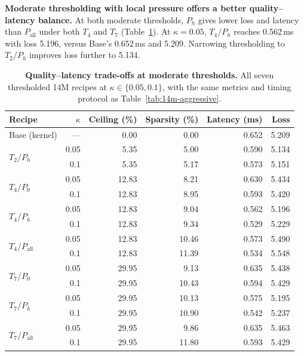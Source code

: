 \textbf{Moderate thresholding with local pressure offers a better quality--latency balance.}
At both moderate thresholds, $P_h$ gives lower loss and latency than $P_{\mathrm{all}}$ under both $T_4$ and $T_7$ (Table~\ref{tab:14m-moderate}). At $\kappa=0.05$, $T_4/P_h$ reaches 0.562\,ms with loss 5.196, versus Base's 0.652\,ms and 5.209. Narrowing thresholding to $T_2/P_h$ improves loss further to 5.134.

\begin{table}[!htbp]
\centering\small
\setlength{\tabcolsep}{7pt}
\caption{\textbf{Quality--latency trade-offs at moderate thresholds.} All seven thresholded 14M recipes at $\kappa\in\{0.05,0.1\}$, with the same metrics and timing protocol as Table~\ref{tab:14m-aggressive}.}
\label{tab:14m-moderate}
\begin{tabular}{@{}lrrrrr@{}}
\toprule
Recipe & $\kappa$ & Ceiling (\%) & Sparsity (\%) & Latency (ms) & Loss \\
\midrule
Base (kernel) & --- & 0.00 & 0.00 & 0.652 & 5.209 \\
\midrule
\multirow{2}{*}{$T_2/P_h$} & 0.05 & 5.35 & 5.00 & 0.590 & 5.134 \\
 & 0.1 & 5.35 & 5.17 & 0.573 & 5.151 \\
\midrule
\multirow{2}{*}{$T_4/P_0$} & 0.05 & 12.83 & 8.21 & 0.630 & 5.434 \\
 & 0.1 & 12.83 & 8.95 & 0.593 & 5.420 \\
\midrule
\multirow{2}{*}{$T_4/P_h$} & 0.05 & 12.83 & 9.04 & 0.562 & 5.196 \\
 & 0.1 & 12.83 & 9.34 & 0.529 & 5.229 \\
\midrule
\multirow{2}{*}{$T_4/P_{\mathrm{all}}$} & 0.05 & 12.83 & 10.46 & 0.573 & 5.490 \\
 & 0.1 & 12.83 & 11.39 & 0.534 & 5.548 \\
\midrule
\multirow{2}{*}{$T_7/P_0$} & 0.05 & 29.95 & 9.13 & 0.635 & 5.438 \\
 & 0.1 & 29.95 & 10.43 & 0.594 & 5.429 \\
\midrule
\multirow{2}{*}{$T_7/P_h$} & 0.05 & 29.95 & 10.13 & 0.575 & 5.195 \\
 & 0.1 & 29.95 & 10.90 & 0.542 & 5.237 \\
\midrule
\multirow{2}{*}{$T_7/P_{\mathrm{all}}$} & 0.05 & 29.95 & 9.86 & 0.635 & 5.463 \\
 & 0.1 & 29.95 & 11.80 & 0.593 & 5.429 \\
\bottomrule
\end{tabular}
\end{table}


